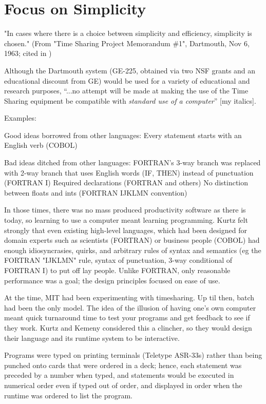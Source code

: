 \documentclass{article}
\begin{document}
\section{Focus on Simplicity}

"In cases where there is a choice between simplicity and efficiency,
simplicity is chosen."  (From "Time Sharing Project Memorandum \#1",
Dartmouth, Nov 6, 1963; cited in \cite{hopl})

Although the Dartmouth system (GE-225, obtained via two NSF grants and
an educational discount from GE) would be used for a variety of
educational and research purposes, 
``...no attempt will be made at making the use of the Time Sharing 
equipment be compatible with \emph{standard use of a computer}'' [my italics].

Examples:

Good ideas borrowed from other languages:
Every statement starts with an English verb (COBOL)

Bad ideas ditched from other languages:
FORTRAN's 3-way branch was replaced with 2-way branch that uses English words (IF,
THEN) instead of punctuation (FORTRAN I)
Required declarations (FORTRAN and others)
No distinction between floats and ints (FORTRAN IJKLMN convention)


In those times,
there was no mass produced productivity
software as there is today, so learning to use a computer meant learning
programming.  Kurtz felt strongly that even existing high-level
languages, which had been designed for domain experts such as scientists
(FORTRAN) or business people (COBOL) 
had enough idiosyncrasies, quirks, and arbitrary rules of syntax and
semantics (eg the FORTRAN "IJKLMN" rule, syntax of punctuation, 3-way
conditional of FORTRAN I) to put off lay people.  Unlike FORTRAN,
only reasonable performance was a goal; the design principles focused on
ease of use.

At the time, MIT had been experimenting with timesharing.  Up til then,
batch had been the only model.  The idea of the illusion of having one's
own computer meant quick turnaround time to test your programs and get
feedback to see if they work.  Kurtz and Kemeny considered this a
clincher, so they would design their language and its runtime system to
be interactive.

Programs were typed on printing terminals (Teletype ASR-33s) rather than
being punched onto cards that were ordered in a deck; hence, each
statement was preceded by a number when typed, and statements would be
executed in numerical order even if typed out of order, and displayed in
order when the runtime was ordered to list the program.
\end{document}
